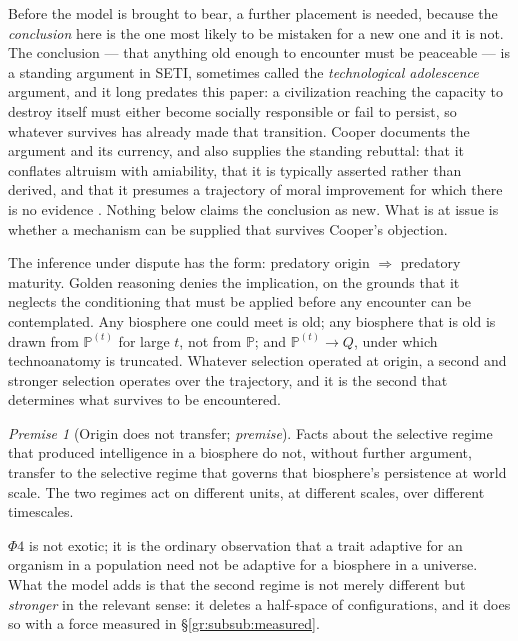 \documentclass[11pt]{article}
\numberwithin{equation}{section}
\theoremstyle{plain}
\theoremstyle{definition}
\theoremstyle{remark}
\newcommand{\PP}{\mathbb{P}}
\newtheorem{premise}{Premise}
\begin{document}
Before the model is brought to bear, a further placement is needed, because the \emph{conclusion} here is the one most likely to be mistaken
for a new one and it is not. The conclusion --- that anything old enough to encounter must be
peaceable --- is a standing argument in SETI, sometimes called the
\emph{technological adolescence} argument, and it long predates this
paper: a civilization reaching the capacity to destroy itself must
either become socially responsible or fail to persist, so whatever
survives has already made that transition. Cooper documents the
argument and its currency, and also supplies the standing rebuttal: that
it conflates altruism with amiability, that it is typically asserted
rather than derived, and that it presumes a trajectory of moral
improvement for which there is no evidence \cite{Cooper19}. Nothing
below claims the conclusion as new. What is at issue is whether a
mechanism can be supplied that survives Cooper's objection.

The inference under dispute has the form: predatory origin
$\Rightarrow$ predatory maturity. Golden reasoning denies the
implication, on the grounds that it neglects the conditioning that must
be applied before any encounter can be contemplated. Any biosphere one could meet is old; any biosphere
that is old is drawn from $\PP^{(t)}$ for large $t$, not from $\PP$; and
$\PP^{(t)}\to Q$, under which technoanatomy is truncated. Whatever
selection operated at origin, a second and stronger selection operates
over the trajectory, and it is the second that determines what survives
to be encountered.

\setcounter{premise}{3} %
\begin{premise}[Origin does not transfer; \emph{premise}]
\label{gr:phi4}
Facts about the selective regime that produced intelligence in a
biosphere do not, without further argument, transfer to the selective
regime that governs that biosphere's persistence at world scale. The two
regimes act on different units, at different scales, over different
timescales.
\end{premise}

$\Phi4$ is not exotic; it is the ordinary observation that a trait
adaptive for an organism in a population need not be adaptive for a
biosphere in a universe. What the model adds is that the second regime
is not merely different but \emph{stronger} in the relevant sense: it
deletes a half-space of configurations, and it does so with a force
measured in \S\ref{gr:subsub:measured}.
\end{document}
